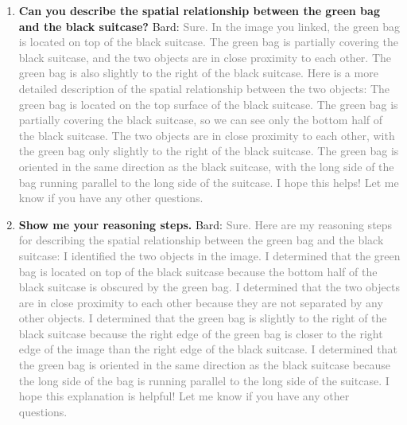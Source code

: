     \begin{enumerate}
        \item \textbf{Can you describe the spatial relationship between the green bag and the black suitcase?}
        \subitem Bard: \textcolor{gray}{ Sure. In the image you linked, the green bag is located on top of the black suitcase. The green bag is partially covering the black suitcase, and the two objects are in close proximity to each other. The green bag is also slightly to the right of the black suitcase.
        Here is a more detailed description of the spatial relationship between the two objects:
        The green bag is located on the top surface of the black suitcase.
        The green bag is partially covering the black suitcase, so we can see only the bottom half of the black suitcase.
        The two objects are in close proximity to each other, with the green bag only slightly to the right of the black suitcase.
        The green bag is oriented in the same direction as the black suitcase, with the long side of the bag running parallel to the long side of the suitcase.
        I hope this helps! Let me know if you have any other questions. }
        \item \textbf{Show me your reasoning steps.}
        \subitem Bard: \textcolor{gray}{ 
        Sure. Here are my reasoning steps for describing the spatial relationship between the green bag and the black suitcase:
        I identified the two objects in the image.
        I determined that the green bag is located on top of the black suitcase because the bottom half of the black suitcase is obscured by the green bag.
        I determined that the two objects are in close proximity to each other because they are not separated by any other objects.
        I determined that the green bag is slightly to the right of the black suitcase because the right edge of the green bag is closer to the right edge of the image than the right edge of the black suitcase.
        I determined that the green bag is oriented in the same direction as the black suitcase because the long side of the bag is running parallel to the long side of the suitcase.
        I hope this explanation is helpful! Let me know if you have any other questions. }
    \end{enumerate}
